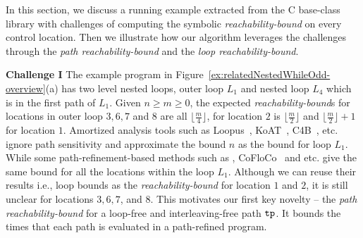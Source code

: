 In this section, we discuss a running example extracted from the C base-class library with
challenges of computing the symbolic
\emph{reachability-bound} on
every control location. Then we illustrate how our algorithm leverages the challenges through the \emph{path reachability-bound} and the \emph{loop reachability-bound}.


\textbf{Challenge I}
The example program in Figure~\ref{ex:relatedNestedWhileOdd-overview}(a) has two level nested loops, outer loop $L_1$ and nested loop $L_4$ which is in the first path of $L_1$. Given $n \geq m \geq 0$,
the expected \emph{reachability-bound}s for locations in outer loop $3, 6, 7$ and $8$ are all $\lfloor\frac{m}{4}\rfloor$,
for location $2$ is $\lfloor\frac{m}{2}\rfloor$ and $\lfloor\frac{m}{2}\rfloor + 1$ for location $1$.
Amortized analysis tools such as Loopus~\cite{SinnZV17}, KoAT~\cite{BrockschmidtEFFG14,FalkeKS12,FalkeKS11}, C4B~\cite{CarbonneauxHS15}, etc. ignore path sensitivity and approximate the bound $n$ as the bound for loop $L_1$. 
While some path-refinement-based methods such as \cite{GulwaniZ10,GulwaniJK09}, CoFloCo~\cite{Montoya17,Flores-Montoya16,Flores-MontoyaH14} and etc. give the same bound for all the locations within the loop $L_1$. 
Although we can reuse their results i.e., loop bounds as the \emph{reachability-bound} for location $1$ and $2$,
it is still unclear for locations $3, 6, 7$, and $8$.
%
This motivates our first key novelty -- the \emph{path reachability-bound}
for a loop-free and interleaving-free path $\mathtt{tp}$.
It bounds the times that each path is evaluated in a path-refined program.

